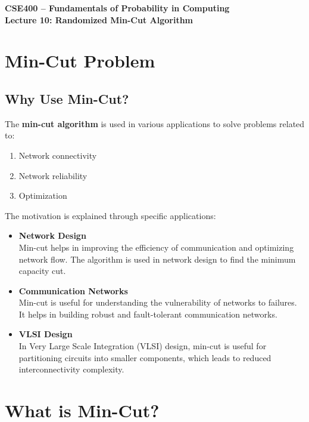 \documentclass[12pt]{article}
\begin{document}
\begin{center}
\Large \textbf{CSE400 – Fundamentals of Probability in Computing} \\
\vspace{0.2cm}
\large \textbf{Lecture 10: Randomized Min-Cut Algorithm}
\end{center}

\vspace{0.5cm}

\section{Min-Cut Problem}

\subsection{Why Use Min-Cut?}

The \textbf{min-cut algorithm} is used in various applications to solve problems related to:
\begin{enumerate}
    \item Network connectivity
    \item Network reliability
    \item Optimization
\end{enumerate}

The motivation is explained through specific applications:

\begin{itemize}
    \item \textbf{Network Design} \\
    Min-cut helps in improving the efficiency of communication and optimizing network flow. The algorithm is used in network design to find the minimum capacity cut.
    
    \item \textbf{Communication Networks} \\
    Min-cut is useful for understanding the vulnerability of networks to failures. It helps in building robust and fault-tolerant communication networks.
    
    \item \textbf{VLSI Design} \\
    In Very Large Scale Integration (VLSI) design, min-cut is useful for partitioning circuits into smaller components, which leads to reduced interconnectivity complexity.
\end{itemize}

\section{What is Min-Cut?}
\end{document}
